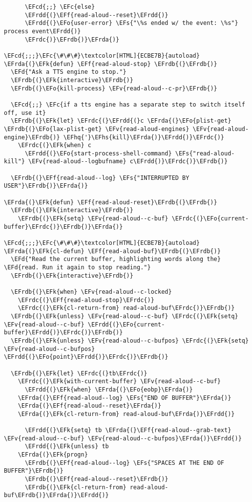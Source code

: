 \documentclass[a4wide,10pt]{article}
\newcommand{\EFc}[1]{\textcolor{EFc}{#1}} %
\newcommand{\EFcd}[1]{\textcolor{EFcd}{#1}} %
\newcommand{\EFs}[1]{\textcolor{EFs}{#1}} %
\newcommand{\EFd}[1]{\textcolor{EFd}{#1}} %
\newcommand{\EFk}[1]{\textcolor{EFk}{#1}} %
\newcommand{\EFf}[1]{\textcolor{EFf}{#1}} %
\newcommand{\EFv}[1]{\textcolor{EFv}{#1}} %
\newcommand{\EFo}[1]{\textcolor{EFo}{#1}} %
\newcommand{\EFhq}[1]{\textcolor{EFhq}{#1}} %
\newcommand{\EFhs}[1]{\textcolor{EFhs}{#1}} %
\newcommand{\EFrda}[1]{\textcolor{EFrda}{#1}} %
\newcommand{\EFrdb}[1]{\textcolor{EFrdb}{#1}} %
\newcommand{\EFrdc}[1]{\textcolor{EFrdc}{#1}} %
\newcommand{\EFrdd}[1]{\textcolor{EFrdd}{#1}} %
\begin{document}
\begin{Code}
\begin{Verbatim}
      \EFcd{;;} \EFc{else}
      \EFrdd{(}\EFf{read-aloud--reset}\EFrdd{)}
      \EFrdd{(}\EFo{user-error} \EFs{"\%s ended w/ the event: \%s"} process event\EFrdd{)}
      \EFrdc{)}\EFrdb{)}\EFrda{)}

\EFcd{;;;}\EFc{\#\#\#}\textcolor[HTML]{ECBE7B}{autoload}
\EFrda{(}\EFk{defun} \EFf{read-aloud-stop} \EFrdb{(}\EFrdb{)}
  \EFd{"Ask a TTS engine to stop."}
  \EFrdb{(}\EFk{interactive}\EFrdb{)}
  \EFrdb{(}\EFo{kill-process} \EFv{read-aloud--c-pr}\EFrdb{)}

  \EFcd{;;} \EFc{if a tts engine has a separate step to switch itself off, use it}
  \EFrdb{(}\EFk{let} \EFrdc{(}\EFrdd{(}c \EFrda{(}\EFo{plist-get} \EFrdb{(}\EFo{lax-plist-get} \EFv{read-aloud-engines} \EFv{read-aloud-engine}\EFrdb{)} \EFhq{'}\EFhs{kill}\EFrda{)}\EFrdd{)}\EFrdc{)}
    \EFrdc{(}\EFk{when} c
      \EFrdd{(}\EFo{start-process-shell-command} \EFs{"read-aloud-kill"} \EFv{read-aloud--logbufname} c\EFrdd{)}\EFrdc{)}\EFrdb{)}

  \EFrdb{(}\EFf{read-aloud--log} \EFs{"INTERRUPTED BY USER"}\EFrdb{)}\EFrda{)}

\EFrda{(}\EFk{defun} \EFf{read-aloud-reset}\EFrdb{(}\EFrdb{)}
  \EFrdb{(}\EFk{interactive}\EFrdb{)}
    \EFrdb{(}\EFk{setq} \EFv{read-aloud--c-buf} \EFrdc{(}\EFo{current-buffer}\EFrdc{)}\EFrdb{)}\EFrda{)}

\EFcd{;;;}\EFc{\#\#\#}\textcolor[HTML]{ECBE7B}{autoload}
\EFrda{(}\EFk{cl-defun} \EFf{read-aloud-buf}\EFrdb{(}\EFrdb{)}
  \EFd{"Read the current buffer, highlighting words along the}
\EFd{read. Run it again to stop reading."}
  \EFrdb{(}\EFk{interactive}\EFrdb{)}

  \EFrdb{(}\EFk{when} \EFv{read-aloud--c-locked}
    \EFrdc{(}\EFf{read-aloud-stop}\EFrdc{)}
    \EFrdc{(}\EFk{cl-return-from} read-aloud-buf\EFrdc{)}\EFrdb{)}
  \EFrdb{(}\EFk{unless} \EFv{read-aloud--c-buf} \EFrdc{(}\EFk{setq} \EFv{read-aloud--c-buf} \EFrdd{(}\EFo{current-buffer}\EFrdd{)}\EFrdc{)}\EFrdb{)}
  \EFrdb{(}\EFk{unless} \EFv{read-aloud--c-bufpos} \EFrdc{(}\EFk{setq} \EFv{read-aloud--c-bufpos} \EFrdd{(}\EFo{point}\EFrdd{)}\EFrdc{)}\EFrdb{)}

  \EFrdb{(}\EFk{let} \EFrdc{(}tb\EFrdc{)}
    \EFrdc{(}\EFk{with-current-buffer} \EFv{read-aloud--c-buf}
      \EFrdd{(}\EFk{when} \EFrda{(}\EFo{eobp}\EFrda{)}
	\EFrda{(}\EFf{read-aloud--log} \EFs{"END OF BUFFER"}\EFrda{)}
	\EFrda{(}\EFf{read-aloud--reset}\EFrda{)}
	\EFrda{(}\EFk{cl-return-from} read-aloud-buf\EFrda{)}\EFrdd{)}

      \EFrdd{(}\EFk{setq} tb \EFrda{(}\EFf{read-aloud--grab-text} \EFv{read-aloud--c-buf} \EFv{read-aloud--c-bufpos}\EFrda{)}\EFrdd{)}
      \EFrdd{(}\EFk{unless} tb
	\EFrda{(}\EFk{progn}
	  \EFrdb{(}\EFf{read-aloud--log} \EFs{"SPACES AT THE END OF BUFFER"}\EFrdb{)}
	  \EFrdb{(}\EFf{read-aloud--reset}\EFrdb{)}
	  \EFrdb{(}\EFk{cl-return-from} read-aloud-buf\EFrdb{)}\EFrda{)}\EFrdd{)}


\end{Verbatim}
\end{Code}
\end{document}
